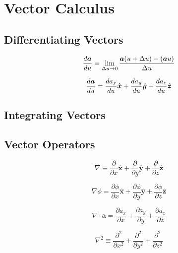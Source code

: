 \chapter{Vector Calculus}

\section{Differentiating Vectors}

\begin{equation*}
    \frac{d\boldsymbol{a}}{du} = \lim_{\Delta u \to 0}
    \frac{\boldsymbol{a}(u + \Delta u)-(\boldsymbol{a}u)}{\Delta u}
\end{equation*}

\begin{equation*}
    \frac{d\boldsymbol{a}}{du} = \frac{da_x}{du}\boldsymbol{\hat{x}} +
    \frac{da_y}{du}\boldsymbol{\hat{y}} +
    \frac{da_z}{du}\boldsymbol{\hat{z}}
\end{equation*}
\section{Integrating Vectors}

\section{Vector Operators}

\begin{equation*}
    \nabla \equiv \frac{\partial}{\partial x}\boldsymbol{\hat{x}} +
    \frac{\partial}{\partial y}\boldsymbol{\hat{y}} +
    \frac{\partial}{\partial z}\boldsymbol{\hat{z}}
\end{equation*}

\begin{equation*}
    \nabla\phi = \frac{\partial\phi}{\partial x}\boldsymbol{\hat{x}} +
    \frac{\partial\phi}{\partial y}\boldsymbol{\hat{y}} +
    \frac{\partial\phi}{\partial z}\boldsymbol{\hat{z}}
\end{equation*}

\begin{equation*}
    \nabla \cdot \boldsymbol{a} = \frac{\partial a_{x}}{\partial x} + \frac{\partial a_{y}}{\partial y} + \frac{\partial a_{z}}{\partial z} 
\end{equation*}

\begin{equation*}
    \nabla^2 \equiv \frac{\partial^2}{\partial x^2} +
    \frac{\partial^2}{\partial y^2} +
    \frac{\partial^2}{\partial z^2}
\end{equation*}

